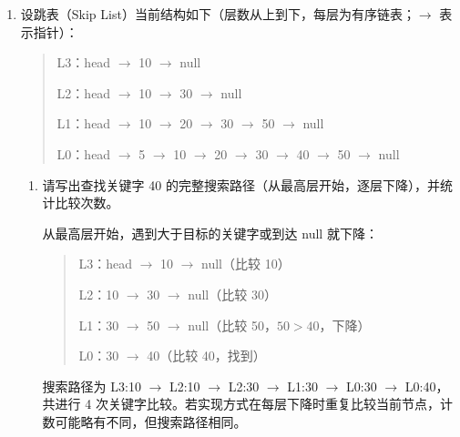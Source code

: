\documentclass[UTF8,a4paper,11pt]{ctexart}
\newenvironment{answer}%
  {\begin{ans}\noindent{\bfseries\color{ansframe}【答案】}\hspace{0.4em}}%
  {\end{ans}}
\begin{document}
\begin{enumerate}
\begin{enumerate}
\item 与布隆过滤器相比，布谷鸟过滤器为何天然支持删除？请结合其存储结构说明。
\begin{answer}
布谷鸟过滤器在每个桶中直接存储元素的短指纹。删除时计算该元素的两个候选桶，找到匹配指纹并清除即可，不需要像普通布隆过滤器那样对多个元素共享的位清零，因此可以安全地支持删除。\par
需要说明：布谷鸟过滤器仍存在指纹碰撞，删除一个未插入的元素时可能误删指纹相同的其他元素；实际系统通过更长的指纹降低该概率。普通布隆过滤器则因多个元素共享同一些位，直接清 0 会破坏其他元素的成员信息，不能安全删除。
\end{answer}
\end{enumerate}

\item 设跳表（Skip List）当前结构如下（层数从上到下，每层为有序链表；$\rightarrow$ 表示指针）：

\begin{quote}\ttfamily\small
L3：head $\rightarrow$ 10 $\rightarrow$ null\par
L2：head $\rightarrow$ 10 $\rightarrow$ 30 $\rightarrow$ null\par
L1：head $\rightarrow$ 10 $\rightarrow$ 20 $\rightarrow$ 30 $\rightarrow$ 50 $\rightarrow$ null\par
L0：head $\rightarrow$ 5 $\rightarrow$ 10 $\rightarrow$ 20 $\rightarrow$ 30 $\rightarrow$ 40 $\rightarrow$ 50 $\rightarrow$ null
\end{quote}

\begin{enumerate}
\item 请写出查找关键字 40 的完整搜索路径（从最高层开始，逐层下降），并统计比较次数。
\begin{answer}
从最高层开始，遇到大于目标的关键字或到达 null 就下降：
\begin{quote}\ttfamily\small
L3：head $\rightarrow$ 10 $\rightarrow$ null\quad（比较 10）\par
L2：10 $\rightarrow$ 30 $\rightarrow$ null\quad（比较 30）\par
L1：30 $\rightarrow$ 50 $\rightarrow$ null\quad（比较 50，$50>40$，下降）\par
L0：30 $\rightarrow$ 40\quad（比较 40，找到）
\end{quote}
搜索路径为 L3:10 $\rightarrow$ L2:10 $\rightarrow$ L2:30 $\rightarrow$ L1:30 $\rightarrow$ L0:30 $\rightarrow$ L0:40，共进行 4 次关键字比较。若实现方式在每层下降时重复比较当前节点，计数可能略有不同，但搜索路径相同。
\end{answer}


\end{enumerate}
\end{enumerate}
\end{document}
